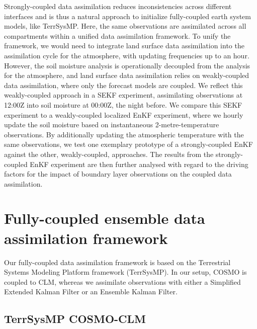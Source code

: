 \documentclass[hess, manuscript]{copernicus}
\begin{document}
Strongly-coupled data assimilation reduces inconsistencies across different interfaces \citep{sawada_hydrometeorology_2018, lin_characteristics_2018, lin_examining_2019} and is thus a natural approach to initialize fully-coupled earth system models, like TerrSysMP. 
Here, the same observations are assimilated across all compartments within a unified data assimilation framework.
To unify the framework, we would need to integrate land surface data assimilation into the assimilation cycle for the atmosphere, with updating frequencies up to an hour.
However, the soil moisture analysis is operationally decoupled from the analysis for the atmosphere, and land surface data assimilation relies on weakly-coupled data assimilation, where only the forecast models are coupled.
We reflect this weakly-coupled approach in a SEKF experiment, assimilating observations at 12:00Z into soil moisture at 00:00Z, the night before.
We compare this SEKF experiment to a weakly-coupled localized EnKF experiment, where we hourly update the soil moisture based on instantaneous 2-metre-temperature observations.
By additionally updating the atmospheric temperature with the same observations, we test one exemplary prototype of a strongly-coupled EnKF against the other, weakly-coupled, approaches.
The results from the strongly-coupled EnKF experiment are then further analysed with regard to the driving factors for the impact of boundary layer observations on the coupled data assimilation.

\section{Fully-coupled ensemble data assimilation framework}
Our fully-coupled data assimilation framework is based on the Terrestrial Systems Modeling Platform framework (TerrSysMP).
In our setup, COSMO is coupled to CLM, whereas we assimilate observations with either a Simplified Extended Kalman Filter or an Ensemble Kalman Filter.


\subsection{TerrSysMP COSMO-CLM}
\end{document}
